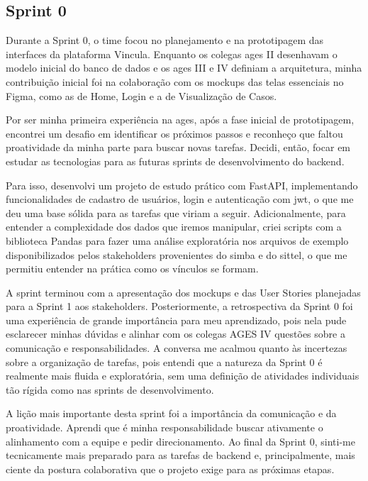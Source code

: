 \subsection{Sprint 0}

Durante a Sprint 0, o time focou no planejamento e na prototipagem das interfaces da plataforma Vincula. Enquanto os colegas \ac{ages} II desenhavam o modelo inicial do banco de dados e os \ac{ages} III e IV definiam a arquitetura, minha contribuição inicial foi na colaboração com os mockups das telas essenciais no Figma, como as de Home, Login e a de Visualização de Casos.

Por ser minha primeira experiência na \ac{ages}, após a fase inicial de prototipagem, encontrei um desafio em identificar os próximos passos e reconheço que faltou proatividade da minha parte para buscar novas tarefas. Decidi, então, focar em estudar as tecnologias para as futuras sprints de desenvolvimento do backend.

Para isso, desenvolvi um projeto de estudo prático com FastAPI, implementando funcionalidades de cadastro de usuários, login e autenticação com \ac{jwt}, o que me deu uma base sólida para as tarefas que viriam a seguir. Adicionalmente, para entender a complexidade dos dados que iremos manipular, criei scripts com a biblioteca Pandas para fazer uma análise exploratória nos arquivos de exemplo disponibilizados pelos stakeholders provenientes do \ac{simba} e do \ac{sittel}, o que me permitiu entender na prática como os vínculos se formam.

A sprint terminou com a apresentação dos mockups e das User Stories planejadas para a Sprint 1 aos stakeholders. Posteriormente, a retrospectiva da Sprint 0 foi uma experiência de grande importância para meu aprendizado, pois nela pude esclarecer minhas dúvidas e alinhar com os colegas AGES IV questões sobre a comunicação e responsabilidades. A conversa me acalmou quanto às incertezas sobre a organização de tarefas, pois entendi que a natureza da Sprint 0 é realmente mais fluida e exploratória, sem uma definição de atividades individuais tão rígida como nas sprints de desenvolvimento.

A lição mais importante desta sprint foi a importância da comunicação e da proatividade. Aprendi que é minha responsabilidade buscar ativamente o alinhamento com a equipe e pedir direcionamento. Ao final da Sprint 0, sinti-me tecnicamente mais preparado para as tarefas de backend e, principalmente, mais ciente da postura colaborativa que o projeto exige para as próximas etapas.